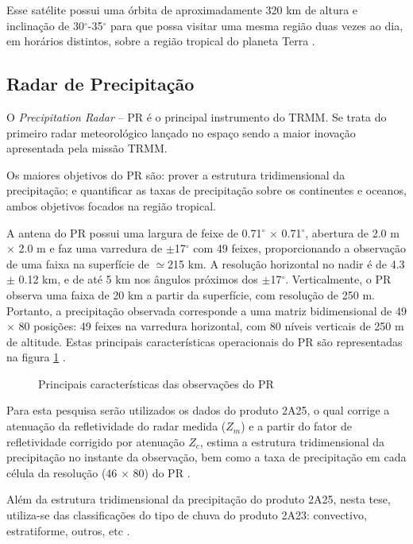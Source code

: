 Esse satélite possui uma órbita de aproximadamente 320 km de altura e inclinação de 30$^{\circ}$-35$^{\circ}$ para que possa visitar uma mesma região duas vezes ao dia, em horários distintos, sobre a região tropical do planeta Terra \cite{simpson1988}.   

\subsection{Radar de Precipitação}

O \textit{Precipitation Radar} -- PR é o principal instrumento do TRMM. Se trata do primeiro radar meteorológico lançado no espaço sendo a maior inovação apresentada pela missão TRMM. 

Os maiores objetivos do PR são: prover a estrutura tridimensional da precipitação; e quantificar as taxas de precipitação sobre os continentes e oceanos, ambos objetivos focados na região tropical. 

A antena do PR possui uma largura de feixe de 0.71$^{\circ}$ $\times$ 0.71$^{\circ}$, abertura de 2.0 m $\times$ 2.0 m e faz uma varredura de $\pm$17$^{\circ}$ com 49 feixes, proporcionando a observação de uma faixa na superfície de $\simeq$215 km. A resolução horizontal no nadir é de 4.3 $\pm$ 0.12 km, e de até 5 km nos ângulos próximos dos $\pm$17$^{\circ}$. Verticalmente, o PR observa uma faixa de 20 km a partir da superfície, com resolução de 250 m. Portanto, a precipitação observada corresponde a uma matriz bidimensional de 49 $\times$ 80 posições: 49 feixes na varredura horizontal, com 80 níveis verticais de 250 m de altitude. Estas principais características operacionais do PR são representadas na figura \ref{prtrmm} \cite{kummerok1998}.

\begin{figure}[!hb]
\caption{Principais características das observações do PR \cite{trmmhandbook}}
\label{prtrmm} 
\end{figure} 

Para esta pesquisa serão utilizados os dados do produto 2A25, o qual corrige a atenuação da refletividade do radar medida ($Z_m$)  e a partir do fator de refletividade corrigido por atenuação $Z_c$, estima a estrutura tridimensional da precipitação no instante da observação, bem como a taxa de precipitação em cada célula da resolução (46 $\times$ 80) do PR \cite{PRv7}. 

Além da estrutura tridimensional da precipitação do produto 2A25, nesta tese, utiliza-se das classificações do tipo de chuva do produto 2A23: convectivo, estratiforme, outros, etc \cite{2A25,PRv7}.
      
